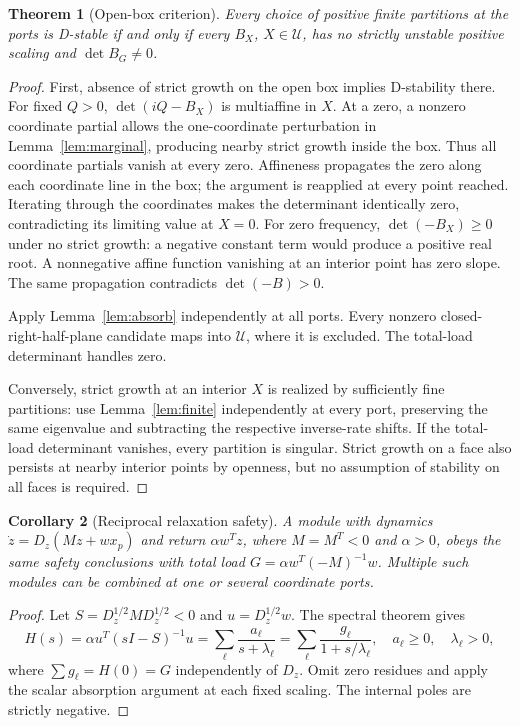 \documentclass[11pt]{article}
\newtheorem{theorem}{Theorem}[section]
\newtheorem{corollary}[theorem]{Corollary}
\theoremstyle{remark}\newtheorem{remark}[theorem]{Remark}
\begin{document}
\begin{theorem}[Open-box criterion]\label{thm:box}
Every choice of positive finite partitions at the ports is D-stable if
and only if every $B_X$, $X\in\mathcal U$, has no strictly unstable
positive scaling and $\det B_G\ne0$.
\end{theorem}
\begin{proof}
First, absence of strict growth on the open box implies D-stability there.
For fixed $Q>0$, $\det(iQ-B_X)$ is multiaffine in $X$. At a zero, a
nonzero coordinate partial allows the one-coordinate perturbation in
Lemma~\ref{lem:marginal}, producing nearby strict growth inside the box.
Thus all coordinate partials vanish at every zero. Affineness propagates
the zero along each coordinate line in the box; the argument is reapplied
at every point reached. Iterating through the coordinates makes the
determinant identically zero, contradicting its limiting value at $X=0$.
For zero frequency, $\det(-B_X)\ge0$ under no strict growth: a negative
constant term would produce a positive real root. A nonnegative affine
function vanishing at an interior point has zero slope. The same
propagation contradicts $\det(-B)>0$.

Apply Lemma~\ref{lem:absorb} independently at all ports. Every nonzero
closed-right-half-plane candidate maps into $\mathcal U$, where it is
excluded. The total-load determinant handles zero.

Conversely, strict growth at an interior $X$ is realized by sufficiently
fine partitions: use Lemma~\ref{lem:finite} independently at every port,
preserving the same eigenvalue and subtracting the respective inverse-rate
shifts. If the total-load determinant vanishes, every partition is singular.
Strict growth on a face also persists at nearby interior points by openness,
but no assumption of stability on all faces is required.
\end{proof}

\begin{corollary}[Reciprocal relaxation safety]\label{cor:relax}
A module with dynamics $\dot z=D_z(Mz+wx_p)$ and return $\alpha w^Tz$,
where $M=M^T<0$ and $\alpha>0$, obeys the same safety conclusions with
total load $G=\alpha w^T(-M)^{-1}w$. Multiple such modules can be combined
at one or several coordinate ports.
\end{corollary}
\begin{proof}
Let $S=D_z^{1/2}MD_z^{1/2}<0$ and $u=D_z^{1/2}w$.
The spectral theorem gives
\[
 H(s)=\alpha u^T(sI-S)^{-1}u
     =\sum_\ell\frac{a_\ell}{s+\lambda_\ell}
     =\sum_\ell\frac{g_\ell}{1+s/\lambda_\ell},
 \quad a_\ell\ge0,\quad\lambda_\ell>0,
\]
where $\sum g_\ell=H(0)=G$ independently of $D_z$.
Omit zero residues and apply the scalar absorption argument at each
fixed scaling. The internal poles are strictly negative.
\end{proof}
\end{document}
